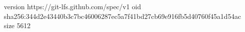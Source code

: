 version https://git-lfs.github.com/spec/v1
oid sha256:344d2e43440b3c7bc46006287ec5a7f41bd27cb69e916fb5d40760f45a1d54ac
size 5612
